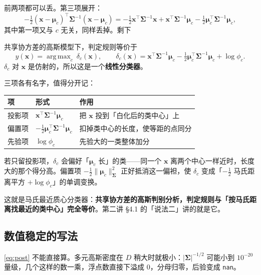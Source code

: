 \documentclass[11pt,a4paper,fontset=windows,zihao=-4]{ctexart}
\newcommand{\bx}{\mathbf{x}}
\newcommand{\bSigma}{\boldsymbol{\Sigma}}
\newcommand{\bmu}{\boldsymbol{\mu}}
\newcommand{\tp}{^{\top}}
\newcommand{\norm}[1]{\lVert #1\rVert}
\newcommand{\abs}[1]{\lvert #1\rvert}
\DeclareMathOperator*{\argmax}{arg\,max}
\newcommand{\tabhead}{\sffamily\bfseries\color{navy}}
\begin{document}
前两项都可以丢。第三项展开：
\[
  -\tfrac12(\bx-\bmu_c)\tp\bSigma^{-1}(\bx-\bmu_c)
  =-\tfrac12\bx\tp\bSigma^{-1}\bx+\bx\tp\bSigma^{-1}\bmu_c-\tfrac12\bmu_c\tp\bSigma^{-1}\bmu_c ,
\]
其中第一项又与 $c$ 无关，同样丢掉。剩下

\begin{prop}[判别函数]
共享协方差的高斯模型下，判定规则等价于
\begin{equation}
  \hat y(\bx)=\argmax_{c}\ \delta_c(\bx),\qquad
  \delta_c(\bx)=\bx\tp\bSigma^{-1}\bmu_c-\tfrac12\bmu_c\tp\bSigma^{-1}\bmu_c+\log\phi_c .
  \label{eq:delta}
\end{equation}
$\delta_c$ 对 $\bx$ 是仿射的，所以这是一个\textbf{线性分类器}。
\end{prop}

三项各有名字，值得分开记：

\begin{center}
\small
\begin{tabular}{@{}lll@{}}
\toprule
\rowcolor{navy!7}
\tabhead 项 & \tabhead 形式 & \tabhead 作用\\
\midrule
投影项 & $\bx\tp\bSigma^{-1}\bmu_c$ & 把 $\bx$ 投到「白化后的类中心」上\\
偏置项 & $-\tfrac12\bmu_c\tp\bSigma^{-1}\bmu_c$ & 扣掉类中心的长度，使等距的点同分\\
先验项 & $\log\phi_c$ & 先验大的一类整体加分\\
\bottomrule
\end{tabular}
\end{center}

\begin{add}[为什么要扣掉一半]
若只留投影项，$\delta_c$ 会偏好「$\bmu_c$ 长」的类——同一个 $\bx$ 离两个中心一样近时，长度大的那个得分高。偏置项 $-\frac12\norm{\bmu_c}^2_{\bSigma}$ 正好抵消这一偏袒，使 $\delta_c$ 变成「$-\frac12$ 马氏距离平方 $+\log\phi_c$」的单调变换。

这就是马氏最近质心分类器：\textbf{共享协方差的高斯判别分析，判定规则与「按马氏距离找最近的类中心」完全等价}。第二讲 §4.1 的「说法二」讲的就是它。
\end{add}

\subsection{数值稳定的写法}

\eqref{eq:post} 不能直接算。多元高斯密度在 $D$ 稍大时就极小：$\abs{\bSigma}^{-1/2}$ 可能小到 $10^{-20}$ 量级，几个这样的数一乘，浮点数直接下溢成 $0$，分母归零，后验变成 \texttt{nan}。
\end{document}
